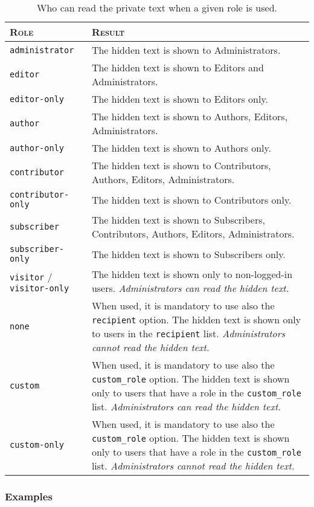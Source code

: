 \documentclass[a4paper,11pt]{article}
\begin{document}
\begin{table}
 \centering
 \begin{tabular}[t]{l p{7cm}}
 \toprule
 \textsc{Role} & \textsc{Result} \\
 \midrule
 \verb+administrator+ & The hidden text is shown to Administrators. \\
 \verb+editor+ & The hidden text is shown to Editors and Administrators. \\
 \verb+editor-only+ & The hidden text is shown to Editors only. \\
 \verb+author+ & The hidden text is shown to Authors, Editors, Administrators. \\
 \verb+author-only+ & The hidden text is shown to Authors only. \\
 \verb+contributor+ & The hidden text is shown to Contributors, Authors, Editors, Administrators. \\
 \verb+contributor-only+ & The hidden text is shown to Contributors only. \\
 \verb+subscriber+ & The hidden text is shown to Subscribers, Contributors, Authors, Editors, Administrators. \\
 \verb+subscriber-only+ & The hidden text is shown to Subscribers only. \\
 \verb+visitor+ / \verb+visitor-only+ & The hidden text is shown only to non-logged-in users. \textit{Administrators can read the hidden text.} \\
 \verb+none+ & When used, it is mandatory to use also the \verb+recipient+ option. The hidden text is shown only to users in the \verb+recipient+ list. \textit{Administrators cannot read the hidden text.} \\
 \verb+custom+ & When used, it is mandatory to use also the \verb+custom_role+ option. The hidden text is shown only to users that have a role in the \verb+custom_role+ list. \textit{Administrators can read the hidden text.} \\
 \verb+custom-only+ & When used, it is mandatory to use also the \verb+custom_role+ option. The hidden text is shown only to users that have a role in the \verb+custom_role+ list. \textit{Administrators cannot read the hidden text.} \\
 \bottomrule
 \end{tabular}
 \caption{Who can read the private text when a given role is used.}
 \label{table:roles}
\end{table}

\subsubsection{Examples}
\end{document}

